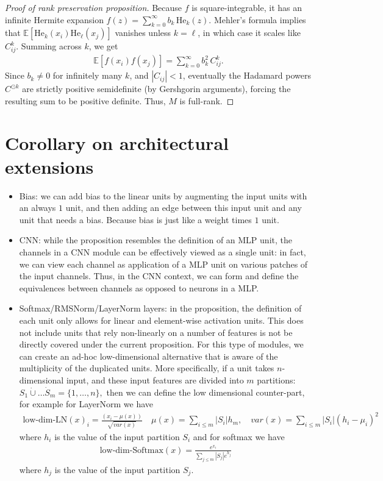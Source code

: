 \documentclass{article}
\newcommand{\He}{\mathrm{He}}
\begin{document}
\begin{proof}[Proof of rank preservation proposition]
Because $f$ is square-integrable, it has an infinite Hermite expansion $f(z)=\sum_{k=0}^{\infty} b_k\, \He_k(z)$. Mehler's formula implies that $\mathbb{E}[\He_k(x_i)\He_\ell(x_j)]$ vanishes unless $k=\ell$, in which case it scales like $C_{ij}^k$. Summing across $k$, we get 
\begin{align*}
\mathbb{E}[f(x_i)f(x_j)] 
= 
\sum_{k=0}^{\infty} b_k^2\,C_{ij}^k.
\end{align*}
Since $b_k\neq 0$ for infinitely many $k$, and $|C_{ij}|<1$, eventually the Hadamard powers $C^{\odot k}$ are strictly positive semidefinite (by Gershgorin arguments), forcing the resulting sum to be positive definite. Thus, $M$ is full-rank.
\end{proof}

\section{Corollary on architectural extensions}
\begin{itemize}
    \item Bias: we can add bias to the linear units by augmenting the input units with an always $1$ unit, and then adding an edge between this input unit and any unit that needs a bias. Because bias is just like a weight times $1$ unit. 
    \item CNN: while the proposition resembles the definition of an MLP unit, the channels in a CNN module can be effectively viewed as a single unit: in fact, we can view each channel as application of a MLP unit on various patches of the input channels. Thus, in the CNN context, we can form and define the equivalences between channels as opposed to neurons in a MLP. 
    \item Softmax/RMSNorm/LayerNorm layers: in the proposition, the definition of each unit only allows for linear and element-wise activation units. This does not include units that rely non-linearly on a number of features is not be directly covered under the current proposition. For this type of modules, we can create an ad-hoc low-dimensional alternative that is aware of the multiplicity of the duplicated units. More specifically, if a unit takes $n$-dimensional input, and these input features are divided into $m$ partitions: $S_1\dot\cup \dots \dot S_m = \{1,\dots, n\}, $ then we can define the low dimensional counter-part, for example for LayerNorm  we have  
    \begin{align*}
        \text{low-dim-LN}(x)_i = \frac{(x_i-\mu(x))}{\sqrt{var(x)}} \quad 
        \mu(x) = \sum_{i\le m} |S_i| h_m, \quad var(x) =\sum_{i\le m} |S_i| (h_i-\mu_i )^2
    \end{align*}
    where $h_i$ is the value of the input partition $S_i$
    and for softmax we have
    \begin{align*}
        \text{low-dim-Softmax}(x) = \frac{e^{x_i}}{\sum_{j\le m} |S_j| e^{h_j}}
    \end{align*}
    where $h_j$ is the value of the input partition $S_j$.
\end{itemize}
\end{document}
